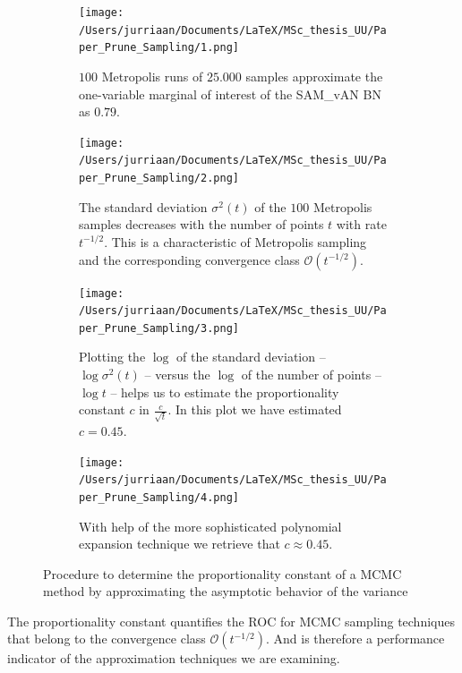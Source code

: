 \documentclass[a4paper, twoside, 11pt]{report}
\theoremstyle{plain}
\theoremstyle{definition}
\theoremstyle{remark}
\begin{document}
\begin{figure}[h!]
\centering
\begin{subfigure}[t]{0.5\textwidth}
  \centering
  \captionsetup{width = 0.9\textwidth}
  \texttt{[image: /Users/jurriaan/Documents/LaTeX/MSc\_thesis\_UU/Paper\_Prune\_Sampling/1.png]}
  \caption{$100$ Metropolis runs of $25.000$ samples approximate the one-variable marginal of interest of the SAM\_vAN BN as $0.79$.}
  \label{sub_a}
\end{subfigure}%
\begin{subfigure}[t]{0.5\textwidth}
  \centering
  \captionsetup{width = 0.9\textwidth}
  \texttt{[image: /Users/jurriaan/Documents/LaTeX/MSc\_thesis\_UU/Paper\_Prune\_Sampling/2.png]}
  \caption{The standard deviation ${\sigma}^2(t)$ of the $100$ Metropolis samples decreases with the number of points $t$ with rate $t^{-1/2}$. This is a characteristic of Metropolis sampling and the corresponding convergence class $\mathcal{O}(t^{-1/2})$.}
  \label{sub_b}
\end{subfigure}

\begin{subfigure}[t]{0.5\textwidth}
  \centering
  \captionsetup{width = 0.9\textwidth}
  \texttt{[image: /Users/jurriaan/Documents/LaTeX/MSc\_thesis\_UU/Paper\_Prune\_Sampling/3.png]}
  \caption{Plotting the $\log$ of the standard deviation -- $\log {\sigma}^2(t)$ -- versus the $\log$ of the number of points -- $\log t$ -- helps us to estimate the proportionality constant $c$ in $\frac{c}{\sqrt{t}}$. In this plot we have estimated $c=0.45$.}
  \label{sub_c}
\end{subfigure}%
\begin{subfigure}[t]{0.5\textwidth}
  \centering
  \captionsetup{width = 0.9\textwidth}
  \texttt{[image: /Users/jurriaan/Documents/LaTeX/MSc\_thesis\_UU/Paper\_Prune\_Sampling/4.png]}
  \caption{With help of the more sophisticated polynomial expansion technique we retrieve that $c \approx 0.45$. }
  \label{sub_d}
\end{subfigure}
\caption{Procedure to determine the proportionality constant of a MCMC method by approximating the asymptotic behavior of the variance}
\label{determine-c}
\end{figure}
The proportionality constant quantifies the ROC for MCMC sampling techniques that belong to the convergence class  $\mathcal{O}(t^{-1/2})$. And is therefore a performance indicator of the approximation techniques we are examining.
\end{document}
